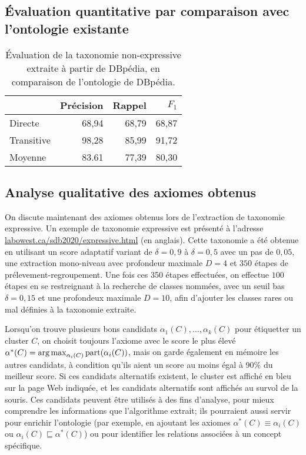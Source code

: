 

\subsection{Évaluation quantitative par comparaison avec l'ontologie existante}


\begin{table}[h]
    \centering
    \caption{Évaluation de la taxonomie non-expressive extraite à partir de DBpédia, en comparaison de l'ontologie de DBpédia.}
    \begin{tabular}{|lrrr|}
        \hline
             & Précision  & Rappel & $F_1$ \\
        \hline
        Directe   &	68,94	&	68,79	&	68,87 \\
        Transitive  &	98,28	&	85,99	&	91,72 \\
        Moyenne & 83.61 & 77,39 & 80,30 \\
        \hline
    \end{tabular}
    \label{tab:extraction-results}
\end{table}



\subsection{Analyse qualitative des axiomes obtenus}

On discute maintenant des axiomes obtenus lors de l'extraction de taxonomie expressive. Un exemple de taxonomie expressive est présenté à l'adresse \href{http://labowest.ca/sdb2020/expressive.html}{labowest.ca/sdb2020/expressive.html} (en anglais). Cette taxonomie a été obtenue en utilisant un score adaptatif variant de $\delta = 0,9$ à $\delta = 0,5$ avec un pas de $0,05$, une extraction mono-niveau avec profondeur maximale $D=4$ et $350$ étapes de prélevement-regroupement. Une fois ces 350 étapes effectuées, on effectue $100$ étapes en se restreignant à la recherche de classes nommées, avec un seuil bas $\delta = 0,15$ et une profondeux maximale $D=10$, afin d'ajouter les classes rares ou mal définies à la taxonomie extraite.

Lorsqu'on trouve plusieurs bons candidats $\alpha_1(C), \ldots, \alpha_k(C)$ pour étiquetter un cluster $C$, on choisit toujours l'axiome avec le score le plus élevé $\alpha^*(C) = \operatorname*{arg\,max}_{\alpha_i(C)} \textrm{part}(\alpha_i(C))$, mais on garde également en mémoire les autres candidats, à condition qu'ils aient un score au moins égal à 90\% du meilleur score. Si ces candidats alternatifs existent, le cluster est affiché en bleu sur la page Web indiquée, et les candidats alternatifs sont affichés au survol de la souris.
Ces candidats peuvent être utilisés à des fins d'analyse, pour mieux comprendre les informations que l'algorithme extrait; ils pourraient aussi servir pour enrichir l'ontologie (par exemple, en ajoutant les axiomes $\alpha^*(C) \equiv \alpha_i(C)$ ou $\alpha_i(C) \sqsubseteq \alpha^*(C)$) ou pour identifier les relations associées à un concept spécifique.

